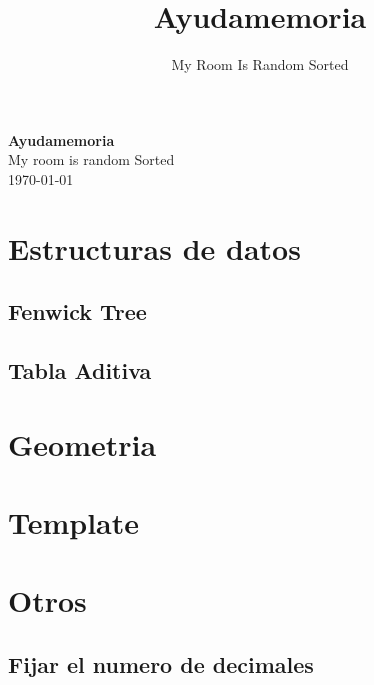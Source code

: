\documentclass[a4paper,11pt,landscape,twocolumn]{article}
\title{Ayudamemoria}
\author{My Room Is Random Sorted}
\begin{document}
\begin{center}
    \LARGE\textbf{Ayudamemoria}\\[1em]
    \large My room is random Sorted\\[1em]
    \normalsize \today\\[1em]
\end{center}

\tableofcontents

\section{Estructuras de datos}

\subsection{Fenwick Tree}



\subsection{Tabla Aditiva}



\section{Geometria}



\section{Template}



\section{Otros}

\subsection{Fijar el numero de decimales}


\end{document}
